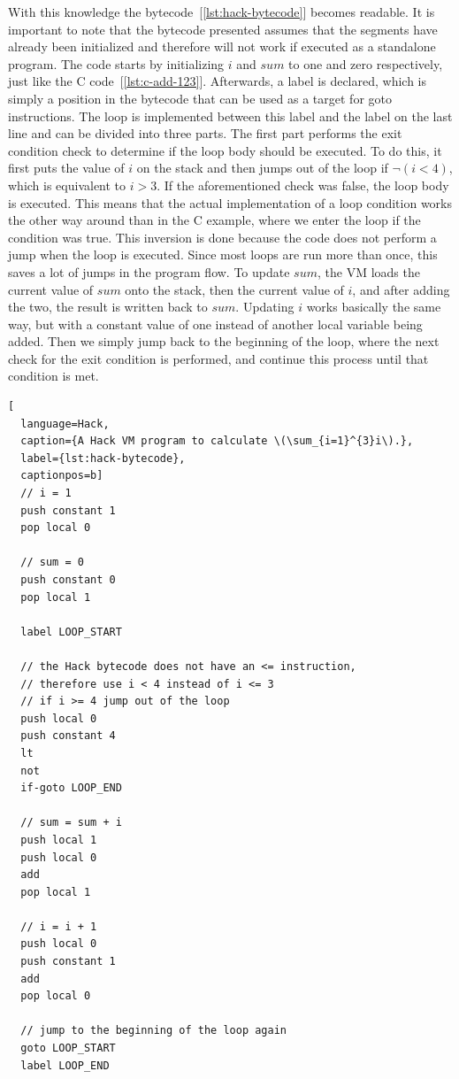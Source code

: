 With this knowledge the bytecode~[\ref{lst:hack-bytecode}] becomes readable.
It is important to note that the bytecode presented assumes that the segments have already been initialized and therefore will not work if executed as a standalone program.
The code starts by initializing \(i\) and \(sum\) to one and zero respectively, just like the C code~[\ref{lst:c-add-123}].
Afterwards, a label is declared, which is simply a position in the bytecode that can be used as a target for goto instructions.
The loop is implemented between this label and the label on the last line and can be divided into three parts.
The first part performs the exit condition check to determine if the loop body should be executed.
To do this, it first puts the value of \(i\) on the stack and then jumps out of the loop if \(\neg(i < 4)\), which is equivalent to \(i > 3\).
If the aforementioned check was false, the loop body is executed.
This means that the actual implementation of a loop condition works the other way around than in the C example, where we enter the loop if the condition was true.
This inversion is done because the code does not perform a jump when the loop is executed.
Since most loops are run more than once, this saves a lot of jumps in the program flow.
To update \(sum\), the VM loads the current value of \(sum\) onto the stack, then the current value of \(i\), and after adding the two, the result is written back to \(sum\).
Updating \(i\) works basically the same way, but with a constant value of one instead of another local variable being added.
Then we simply jump back to the beginning of the loop, where the next check for the exit condition is performed, and continue this process until that condition is met.

\begin{lstlisting}[
  language=Hack,
  caption={A Hack VM program to calculate \(\sum_{i=1}^{3}i\).},
  label={lst:hack-bytecode},
  captionpos=b]
  // i = 1
  push constant 1
  pop local 0

  // sum = 0
  push constant 0
  pop local 1

  label LOOP_START

  // the Hack bytecode does not have an <= instruction,
  // therefore use i < 4 instead of i <= 3
  // if i >= 4 jump out of the loop
  push local 0
  push constant 4
  lt
  not
  if-goto LOOP_END

  // sum = sum + i
  push local 1
  push local 0
  add
  pop local 1

  // i = i + 1
  push local 0
  push constant 1
  add
  pop local 0

  // jump to the beginning of the loop again
  goto LOOP_START
  label LOOP_END
\end{lstlisting}

